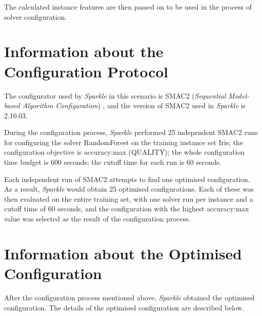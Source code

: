 \documentclass[british]{article}
\newif\iffeatures
\begin{document}
        The calculated instance features are then passed on to be used in the process of solver configuration. 

\fi


\section{Information about the Configuration Protocol}

The configurator used by \emph{Sparkle} in this scenario is SMAC2 ({\em Sequential Model-based Algorithm Configuration}) \cite{SMAC2}, and the version of SMAC2 used in \emph{Sparkle} is 2.10.03.

During the configuration process, \emph{Sparkle} performed 25 independent SMAC2 runs for configuring the solver RandomForest on the training instance set Iris\iffeatures; the instance features of the training instance set were used for configuration\fi; the configuration objective is accuracy:max (QUALITY); the whole configuration time budget is 600 seconds; the cutoff time for each run is 60 seconds.

Each independent run of SMAC2 attempts to find one optimised configuration. As a result, \emph{Sparkle} would obtain 25 optimised configurations. Each of these was then evaluated on the entire training set, with one solver run per instance and a cutoff time of 60 seconds, and the configuration with the highest accuracy:max value was selected as the result of the configuration process.

\section{Information about the Optimised Configuration}

After the configuration process mentioned above, \emph{Sparkle} obtained the optimised configuration. The details of the optimised configuration are described below.

\vspace{5mm}
\end{document}
